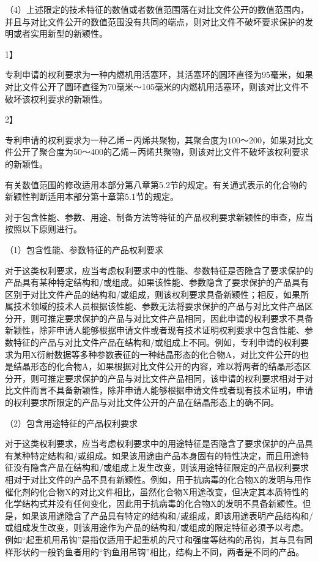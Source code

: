 {\setlength{\parindent}{17.1bp}（4）上述限定的技术特征的数值或者数值范围落在对比文件公开的数值范围内，并且与对比文件公开的数值范围没有共同的端点，则对比文件不破坏要求保护的发明或者实用新型的新颖性。\par}

{1】\par}

专利申请的权利要求为一种内燃机用活塞环，其活塞环的圆环直径为95毫米，如果对比文件公开了圆环直径为70毫米～105毫米的内燃机用活塞环，则该对比文件不破坏该权利要求的新颖性。

{2】\par}

专利申请的权利要求为一种乙烯－丙烯共聚物，其聚合度为100～200，如果对比文件公开了聚合度为50～400的乙烯－丙烯共聚物，则该对比文件不破坏该权利要求的新颖性。

有关数值范围的修改适用本部分第八章第5.2节的规定。有关通式表示的化合物的新颖性判断适用本部分第十章第5.1节的规定。

对于包含性能、参数、用途、制备方法等特征的产品权利要求新颖性的审查，应当按照以下原则进行。

{\setlength{\parindent}{17.1bp}（1）包含性能、参数特征的产品权利要求\par}

对于这类权利要求，应当考虑权利要求中的性能、参数特征是否隐含了要求保护的产品具有某种特定结构和/或组成。如果该性能、参数隐含了要求保护的产品具有区别于对比文件产品的结构和/或组成，则该权利要求具备新颖性；相反，如果所属技术领域的技术人员根据该性能、参数无法将要求保护的产品与对比文件产品区分开，则可推定要求保护的产品与对比文件产品相同，因此申请的权利要求不具备新颖性，除非申请人能够根据申请文件或者现有技术证明权利要求中包含性能、参数特征的产品与对比文件产品在结构和/或组成上不同。例如，专利申请的权利要求为用X衍射数据等多种参数表征的一种结晶形态的化合物A，对比文件公开的也是结晶形态的化合物A，如果根据对比文件公开的内容，难以将两者的结晶形态区分开，则可推定要求保护的产品与对比文件产品相同，该申请的权利要求相对于对比文件而言不具备新颖性，除非申请人能够根据申请文件或者现有技术证明，申请的权利要求所限定的产品与对比文件公开的产品在结晶形态上的确不同。

{\setlength{\parindent}{17.1bp}（2）包含用途特征的产品权利要求\par}

对于这类权利要求，应当考虑权利要求中的用途特征是否隐含了要求保护的产品具有某种特定结构和/或组成。如果该用途由产品本身固有的特性决定，而且用途特征没有隐含产品在结构和/或组成上发生改变，则该用途特征限定的产品权利要求相对于对比文件的产品不具有新颖性。例如，用于抗病毒的化合物X的发明与用作催化剂的化合物X的对比文件相比，虽然化合物X用途改变，但决定其本质特性的化学结构式并没有任何变化，因此用于抗病毒的化合物X的发明不具备新颖性。但是，如果该用途隐含了产品具有特定的结构和/或组成，即该用途表明产品结构和/或组成发生改变，则该用途作为产品的结构和/或组成的限定特征必须予以考虑。例如“起重机用吊钩”是指仅适用于起重机的尺寸和强度等结构的吊钩，其与具有同样形状的一般钓鱼者用的“钓鱼用吊钩”相比，结构上不同，两者是不同的产品。

